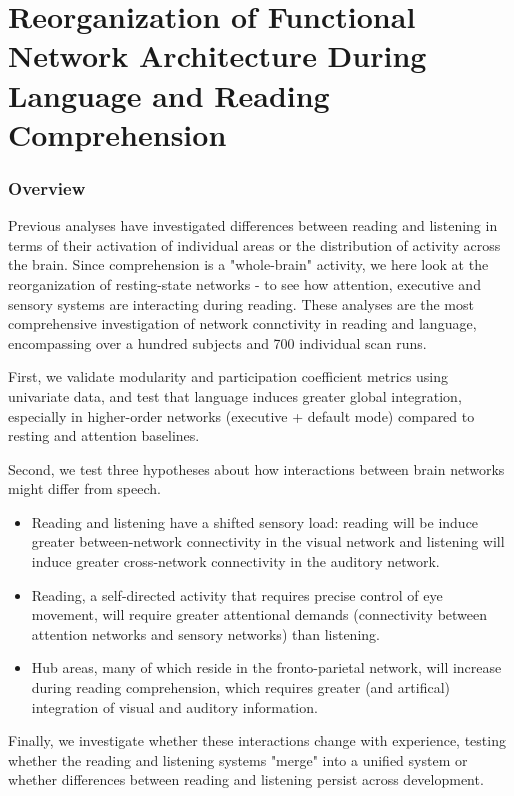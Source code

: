 \chapter{Reorganization of Functional Network Architecture During Language and Reading Comprehension}

\subsection{Overview}

Previous analyses have investigated differences between reading and listening in terms of their activation of individual areas or the distribution of activity across the brain. Since comprehension is a "whole-brain" activity, we here look at the reorganization of resting-state networks - to see how attention, executive and sensory systems are interacting during reading.  These analyses are the most comprehensive investigation of network connctivity in reading and language, encompassing over a hundred subjects and 700 individual scan runs. 

First, we validate modularity and participation coefficient metrics using univariate data, and test that language induces greater global integration, especially in higher-order networks (executive + default mode) compared to resting and attention baselines.

Second, we test three hypotheses about how interactions between brain networks might differ from speech.
\begin{itemize}
	\item Reading and listening have a shifted sensory load: reading will be induce greater between-network connectivity in the visual network and listening will induce greater cross-network connectivity in the auditory network.  
	\item Reading, a self-directed activity that requires precise control of eye movement, will require greater attentional demands (connectivity between attention networks and sensory networks) than listening. 
	\item Hub areas, many of which reside in the fronto-parietal network, will increase during reading comprehension, which requires greater (and artifical) integration of visual and auditory information.
\end{itemize}

Finally, we investigate whether these interactions change with experience, testing whether the reading and listening systems "merge" into a unified system or whether differences between reading and listening persist across development.

